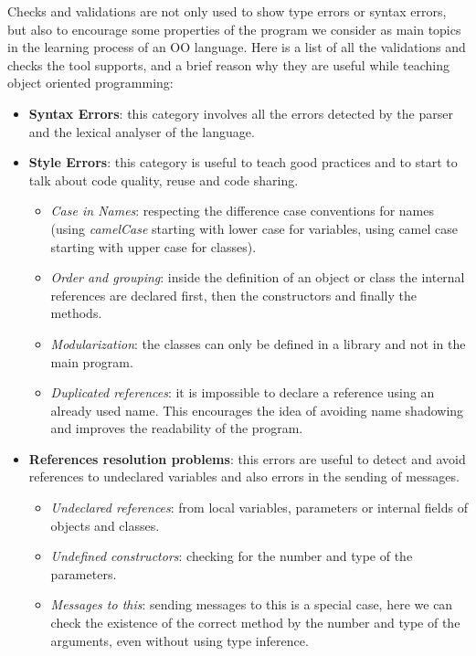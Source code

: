 Checks and validations are not only used to show type errors or syntax errors, 
but also to encourage some properties of the program we consider as main topics in the learning process of an OO language.
Here is a list of all the validations and checks the tool supports, and a brief reason why they are useful while teaching object oriented programming:

\begin{itemize}
  \item \textbf{Syntax Errors}: this category involves all the errors detected by the parser and the lexical analyser of the language.
  \item \textbf{Style Errors}: this category is useful to teach good practices and to start to talk about code quality, reuse and code sharing.
	\begin{itemize}
		\item \textit{Case in Names}: respecting the difference case conventions for
		names (\eg using \textit{camelCase} starting with lower case for variables,
		using camel case starting with upper case for classes).
		\item \textit{Order and grouping}: inside the definition of an object or class the internal references are declared first, then the constructors and finally the methods.
		\item \textit{Modularization}: the classes can only be defined in a library and not in the main program.		
		\item \textit{Duplicated references}: it is impossible to declare a reference using an already used name. 
			This encourages the idea of avoiding name shadowing and improves the readability of the program.
	\end{itemize}
  \item \textbf{References resolution problems}: this errors are useful to detect and avoid references to undeclared variables and also errors in the sending of messages.
  
	\begin{itemize}
	  \item \textit{Undeclared references}: from local variables, parameters or internal fields of objects and classes.
	  \item \textit{Undefined constructors}: checking for the number and type of the parameters.
	  \item \textit{Messages to this}: sending messages to this is a special case, here we can check the existence of the correct method by the number and type of the arguments, even without using type inference.
	\end{itemize}
	

\end{itemize}

